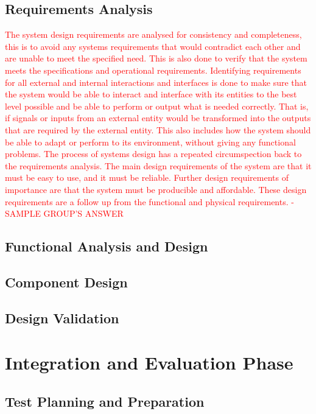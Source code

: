 \documentclass[a4paper,11pt,fleqn]{report}
\begin{document}
\subsection{Requirements Analysis}
\textcolor{red}{The system design requirements are analysed for consistency and completeness, this is to avoid any systems requirements that would contradict each other and are unable to meet the specified need. This is also done to verify that the system meets the specifications and operational requirements. Identifying requirements for all external and internal interactions and interfaces is done to make sure that the system would be able to interact and interface with its entities to the best level possible and be able to perform or output what is needed correctly. That is, if signals or inputs from an external entity would be transformed into the outputs that are required by the external entity. This also includes how the system should be able to adapt or perform to its environment, without giving any functional problems.
The process of systems design has a repeated circumspection back to the requirements analysis. The main design requirements of the system are that it must be easy to use, and it must be reliable. Further design requirements of importance are that the system must be producible and affordable. These design requirements are a follow up from the functional and physical requirements. - SAMPLE GROUP'S ANSWER}

\subsection{Functional Analysis and Design}

\subsection{Component Design}

\subsection{Design Validation}

\section{Integration and Evaluation Phase}

\subsection{Test Planning and Preparation}
\end{document}
